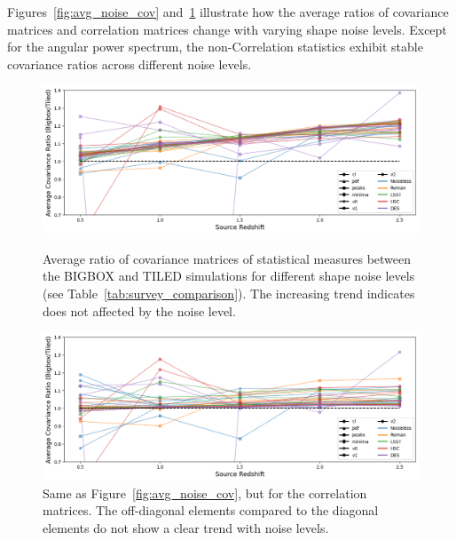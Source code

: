 Figures~\ref{fig:avg_noise_cov} and~\ref{fig:avg_noise_corr} illustrate how the average ratios of covariance matrices and correlation matrices change with varying shape noise levels. Except for the angular power spectrum, the non-Correlation statistics exhibit stable covariance ratios across different noise levels. 

\begin{figure}[p]
    \centering
    \includegraphics[width=\textwidth]{figures/results/avg_cov_ratio_ngal.png}
    \caption{Average ratio of covariance matrices of statistical measures between the BIGBOX and TILED simulations for different shape noise levels (see Table~\ref{tab:survey_comparison}). The increasing trend indicates does not affected by the noise level.}
    \label{fig:avg_noise_cov}
    \vspace{2cm}
    \includegraphics[width=\textwidth]{figures/results/avg_corr_ratio_ngal.png}
    \caption{Same as Figure~\ref{fig:avg_noise_cov}, but for the correlation matrices. The off-diagonal elements compared to the diagonal elements do not show a clear trend with noise levels.}
    \label{fig:avg_noise_corr}
\end{figure}

